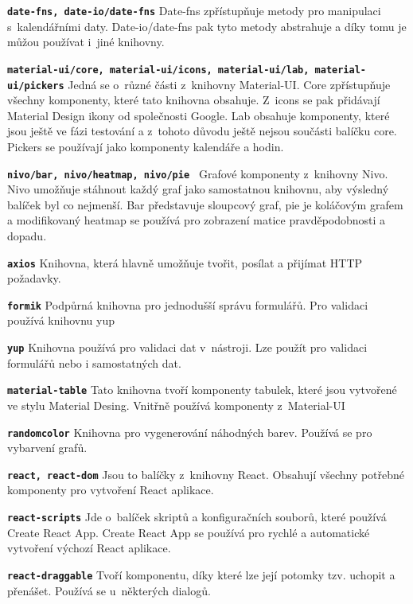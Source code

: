 \begin{DESCRIPTION}
\item \texttt{\textbf{date-fns, date-io/date-fns}} Date-fns zpřístupňuje metody pro manipulaci s~kalendářními daty. Date-io/date-fns pak tyto metody abstrahuje a díky tomu je můžou používat i~jiné knihovny.
\item \texttt{\textbf{material-ui/core, material-ui/icons, material-ui/lab, material-ui/pickers}} \newline Jedná se o~různé části z~knihovny Material-UI. Core zpřístupňuje všechny komponenty, které tato knihovna obsahuje. Z~icons se pak přidávají Material Design ikony od společnosti Google. Lab obsahuje komponenty, které jsou ještě ve fázi testování a z~tohoto důvodu ještě nejsou součásti balíčku core. Pickers se používají jako komponenty kalendáře a hodin.
\item \texttt{\textbf{nivo/bar, nivo/heatmap, nivo/pie }} Grafové komponenty z~knihovny Nivo. Nivo umožňuje stáhnout každý graf jako samostatnou knihovnu, aby výsledný balíček byl co nejmenší. Bar představuje sloupcový graf, pie je koláčovým grafem a modifikovaný heatmap se používá pro zobrazení matice pravděpodobnosti a dopadu. 
\item \texttt{\textbf{axios}} Knihovna, která hlavně umožňuje tvořit, posílat a přijímat HTTP požadavky.
\item \texttt{\textbf{formik}} Podpůrná knihovna pro jednodušší správu formulářů. Pro validaci používá knihovnu yup
\item \texttt{\textbf{yup}} Knihovna používá pro validaci dat v~nástroji. Lze použít pro validaci formulářů nebo i samostatných dat.
\item \texttt{\textbf{material-table}} Tato knihovna tvoří komponenty tabulek, které jsou vytvořené ve stylu Material Desing. Vnitřně používá komponenty z~Material-UI
\item \texttt{\textbf{randomcolor}} Knihovna pro vygenerování náhodných barev. Používá se pro vybarvení grafů.
\item \texttt{\textbf{react, react-dom}} Jsou to balíčky z~knihovny React. Obsahují všechny potřebné komponenty pro vytvoření React aplikace. 
\item \texttt{\textbf{react-scripts}} Jde o~balíček skriptů a konfiguračních souborů, které používá Create React App. Create React App se používá pro rychlé a automatické vytvoření výchozí React aplikace.
\item \texttt{\textbf{react-draggable}} Tvoří komponentu, díky které lze její potomky tzv. uchopit a přenášet. Používá se u~některých dialogů.

\end{DESCRIPTION}
